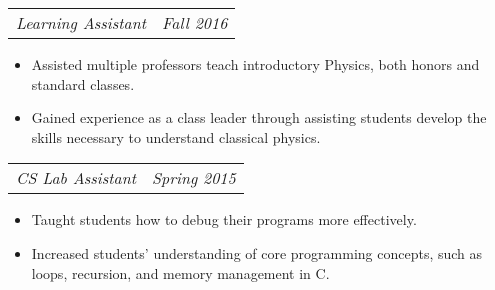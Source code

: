 \documentclass[letterpaper,10pt]{article}
\makeatletter
\newcommand{\resitem}[1]{\item #1 \vspace{-2pt}}
\newcommand{\secondsubheading}[2]{
    \begin{tabular*}{6.5in}{l@{\cftdotfill{\cftsecdotsep}\extracolsep{\fill}}r}
      \textit{#1} & \textit{#2} \\
  \end{tabular*}\vspace{-6pt}}
\makeatother
\begin{document}
\begin{itemize}
      \secondsubheading{Learning Assistant}{Fall 2016}
      \begin{itemize}
          \resitem{Assisted multiple professors teach introductory Physics, both honors and standard classes.}
          \resitem{Gained experience as a class leader through assisting students develop the skills necessary to understand classical physics.}
      \end{itemize}

      \secondsubheading{CS Lab Assistant}{Spring 2015}
      \begin{itemize}
          \resitem{Taught students how to debug their programs more effectively.}
          \resitem{Increased students' understanding of core programming concepts, such as loops, recursion, and memory management in C.}
      \end{itemize}

  \end{itemize}
\end{document}
